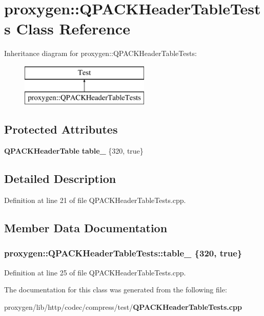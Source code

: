 \section{proxygen\+:\+:Q\+P\+A\+C\+K\+Header\+Table\+Tests Class Reference}
\label{classproxygen_1_1QPACKHeaderTableTests}
Inheritance diagram for proxygen\+:\+:Q\+P\+A\+C\+K\+Header\+Table\+Tests\+:\begin{figure}[H]
\begin{center}
\leavevmode
\includegraphics[height=2.000000cm]{classproxygen_1_1QPACKHeaderTableTests}
\end{center}
\end{figure}
\subsection*{Protected Attributes}
\begin{DoxyCompactItemize}
\item 
{\bf Q\+P\+A\+C\+K\+Header\+Table} {\bf table\+\_\+} \{320, true\}
\end{DoxyCompactItemize}


\subsection{Detailed Description}


Definition at line 21 of file Q\+P\+A\+C\+K\+Header\+Table\+Tests.\+cpp.



\subsection{Member Data Documentation}
\subsubsection[{table\+\_\+}]{ proxygen\+::\+Q\+P\+A\+C\+K\+Header\+Table\+Tests\+::table\+\_\+ \{320, true\}\hspace{0.3cm}{\ttfamily [protected]}}\label{classproxygen_1_1QPACKHeaderTableTests_aa1c0ea2f83ec264c1a3225345198603c}


Definition at line 25 of file Q\+P\+A\+C\+K\+Header\+Table\+Tests.\+cpp.



The documentation for this class was generated from the following file\+:\begin{DoxyCompactItemize}
\item 
proxygen/lib/http/codec/compress/test/{\bf Q\+P\+A\+C\+K\+Header\+Table\+Tests.\+cpp}\end{DoxyCompactItemize}
